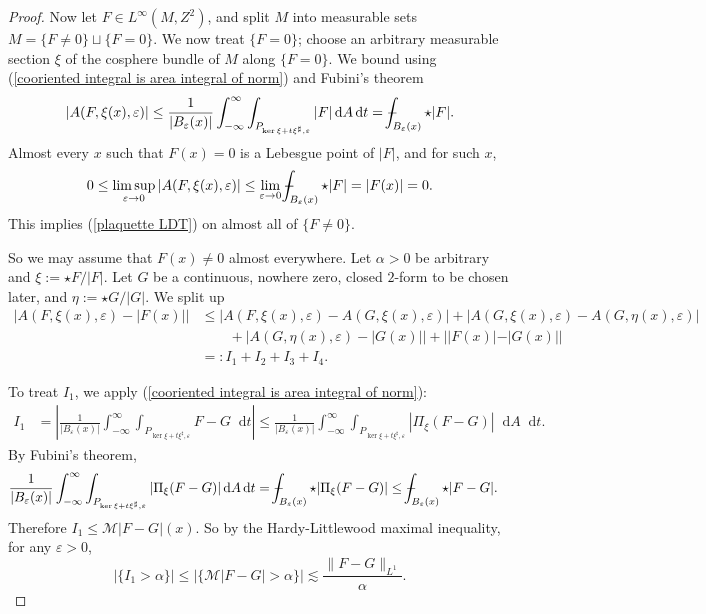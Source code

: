 \documentclass[reqno,11pt]{amsart}
\newcommand*\dif{\mathop{}\!\mathrm{d}}
\theoremstyle{definition}
\numberwithin{equation}{section}
\def\Xint#1{\mathchoice
{\XXint\displaystyle\textstyle{#1}}%
{\XXint\textstyle\scriptstyle{#1}}%
{\XXint\scriptstyle\scriptscriptstyle{#1}}%
{\XXint\scriptscriptstyle\scriptscriptstyle{#1}}%
\!\int}
\def\XXint#1#2#3{{\setbox0=\hbox{$#1{#2#3}{\int}$ }
\vcenter{\hbox{$#2#3$ }}\kern-.6\wd0}}
\def\dashint{\Xint-}
\begin{document}
\begin{proof}
Now let $F \in L^\infty(M, Z^2)$, and split $M$ into measurable sets $M = \{F \neq 0\} \sqcup \{F = 0\}$.
We now treat $\{F = 0\}$; choose an arbitrary measurable section $\xi$ of the cosphere bundle of $M$ along $\{F = 0\}$.
We bound using (\ref{cooriented integral is area integral of norm}) and Fubini's theorem
$$|A(F, \xi(x), \varepsilon)| \leq \frac{1}{|B_\varepsilon(x)|} \int_{-\infty}^\infty \int_{P_{\ker \xi + t\xi^\sharp, \varepsilon}} |F| \dif A \dif t = \dashint_{B_\varepsilon(x)} \star |F|.$$
Almost every $x$ such that $F(x) = 0$ is a Lebesgue point of $|F|$, and for such $x$,
$$0 \leq \limsup_{\varepsilon \to 0} |A(F, \xi(x), \varepsilon)| \leq \lim_{\varepsilon \to 0} \dashint_{B_\varepsilon(x)} \star |F| = |F(x)| = 0.$$
This implies (\ref{plaquette LDT}) on almost all of $\{F \neq 0\}$.

So we may assume that $F(x) \neq 0$ almost everywhere.
Let $\alpha > 0$ be arbitrary and $\xi := \star F/|F|$.
Let $G$ be a continuous, nowhere zero, closed $2$-form to be chosen later, and $\eta := \star G/|G|$.
We split up
\begin{align*}
|A(F, \xi(x), \varepsilon) - |F(x)||
&\leq |A(F, \xi(x), \varepsilon) - A(G, \xi(x), \varepsilon)| + |A(G, \xi(x), \varepsilon) - A(G, \eta(x), \varepsilon)| \\
&\qquad + |A(G, \eta(x), \varepsilon) - |G(x)|| + ||F(x)| - |G(x)||\\
&=: I_1 + I_2 + I_3 + I_4.
\end{align*}

To treat $I_1$, we apply (\ref{cooriented integral is area integral of norm}):
\begin{align*}
I_1
&= \left|\frac{1}{|B_\varepsilon(x)|} \int_{-\infty}^\infty \int_{P_{\ker \xi + t\xi^\sharp, \varepsilon}} F - G \dif t\right| 
\leq \frac{1}{|B_\varepsilon(x)|} \int_{-\infty}^\infty \int_{P_{\ker \xi + t\xi^\sharp, \varepsilon}} |\Pi_\xi(F - G)| \dif A \dif t.
\end{align*}
By Fubini's theorem, 
\begin{align*}
\frac{1}{|B_\varepsilon(x)|} \int_{-\infty}^\infty \int_{P_{\ker \xi + t\xi^\sharp, \varepsilon}} |\Pi_\xi(F - G)| \dif A \dif t
&= \dashint_{B_\varepsilon(x)} \star|\Pi_\xi(F - G)| \leq \dashint_{B_\varepsilon(x)} \star |F - G|.
\end{align*}
Therefore $I_1 \leq \mathcal M|F - G|(x)$.
So by the Hardy-Littlewood maximal inequality, for any $\varepsilon > 0$,
$$|\{I_1 > \alpha\}| \leq |\{\mathcal M |F - G| > \alpha\}| \lesssim \frac{\|F - G\|_{L^1}}{\alpha}.$$


\end{proof}
\end{document}
